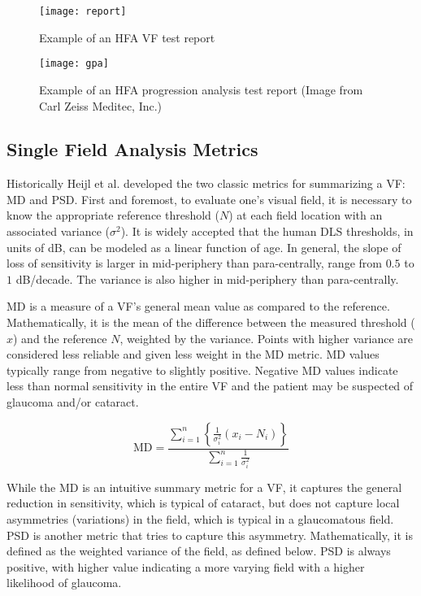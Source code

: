 \begin{figure}[p]
	\texttt{[image: report]}
	\caption{Example of an \ac{HFA} \ac{VF} test report}
	\label{fig:report}
\end{figure}

\begin{figure}[p]
	\texttt{[image: gpa]}
	\caption{Example of an \ac{HFA} progression analysis test report (Image from Carl Zeiss Meditec, Inc.)}
	\label{fig:gpa}
\end{figure}

\subsection{Single Field Analysis Metrics}

Historically Heijl et al. developed the two classic metrics for summarizing a \ac{VF}: \ac{MD} and \ac{PSD}. \cite{Heijl1987} First and foremost, to evaluate one's visual field, it is necessary to know the appropriate reference threshold ($N$) at each field location with an associated variance ($\sigma^2$). It is widely accepted that the human \ac{DLS} thresholds, in units of dB, can be modeled as a linear function of age. \cite{Heijl1987a} In general, the slope of loss of sensitivity is larger in mid-periphery than para-centrally, range from $0.5$ to $1$ dB/decade. The variance is also higher in mid-periphery than para-centrally. 

\ac{MD} is a measure of a \ac{VF}'s general mean value as compared to the reference. Mathematically, it is the mean of the difference between the measured threshold ($x$) and the reference $N$, weighted by the variance. Points with higher variance are considered less reliable and given less weight in the \ac{MD} metric. MD values typically range from negative to slightly positive. Negative MD values indicate less than normal sensitivity in the entire \ac{VF} and the patient may be suspected of glaucoma and/or cataract.

\begin{equation}
\textrm{MD} =\frac{ 
\sum\limits_{i=1}^{n} \left\{
\frac{1}{\sigma_{i}^2} (x_i-N_i)
\right\} }{
\sum\limits_{i=1}^{n} 
\frac{1}{\sigma_{i}^2} 
}
\end{equation}

While the \ac{MD} is an intuitive summary metric for a \ac{VF}, it captures the general reduction in sensitivity, which is typical of cataract, but does not capture local asymmetries (variations) in the field, which is typical in a glaucomatous field. \ac{PSD} is another metric that tries to capture this asymmetry. Mathematically, it is defined as the weighted variance of the field, as defined below. \ac{PSD} is always positive, with higher value indicating a more varying field with a higher likelihood of glaucoma. 

